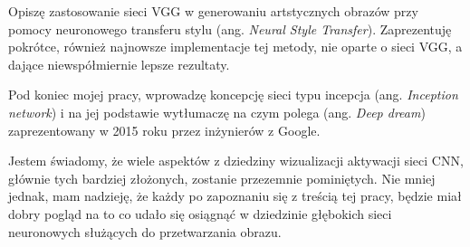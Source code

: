 Opiszę zastosowanie sieci VGG w generowaniu artstycznych obrazów przy pomocy neuronowego transferu stylu (ang. \textit{Neural Style Transfer}). Zaprezentuję pokrótce, również najnowsze implementacje tej metody, nie oparte o sieci VGG, a dające niewspółmiernie lepsze rezultaty.

Pod koniec mojej pracy, wprowadzę koncepcję sieci typu incepcja (ang. \textit{Inception network}) i na jej
podstawie wytłumaczę na czym polega (ang. \textit{Deep dream}) zaprezentowany w 2015 roku przez inżynierów z Google.

Jestem świadomy, że wiele aspektów z dziedziny wizualizacji aktywacji sieci CNN, głównie tych bardziej złożonych, zostanie przezemnie pominiętych. Nie mniej jednak, mam nadzieję, że każdy po zapoznaniu się z treścią tej pracy, będzie miał dobry pogląd na to co udało się osiągnąć w dziedzinie głębokich sieci neuronowych służących do przetwarzania obrazu.
